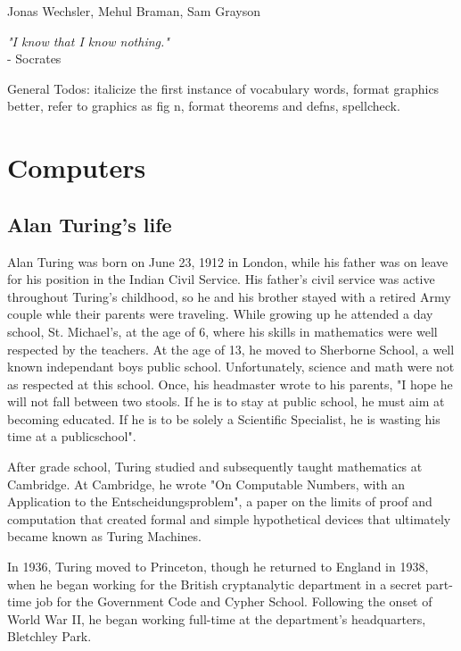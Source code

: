 \documentclass[11pt, letterpaper, twoside, openright]{book}
\begin{document}
\mainmatter

{Jonas Wechsler, Mehul Braman, Sam Grayson}

\begin{flushright}
\textit{"I know that I know nothing."} \\
- Socrates
\end{flushright}

General Todos: italicize the first instance of vocabulary words, format graphics better, refer to graphics as fig n, format theorems and defns, spellcheck.

\section{Computers}  %
\subsection{Alan Turing's life}
Alan Turing was born on June 23, 1912 in London, while his father was on leave for his position in the Indian Civil Service. His father's civil service was active throughout Turing's childhood, so he and his brother stayed with a retired Army couple whle their parents were traveling. While growing up he attended a day school, St. Michael's, at the age of 6, where his skills in mathematics were well respected by the teachers. At the age of 13, he moved to Sherborne School, a well known independant boys public school. Unfortunately, science and math were not as respected at this school. Once, his headmaster wrote to his parents, "I hope he will not fall between two stools. If he is to stay at public school, he must aim at becoming educated. If he is to be solely a Scientific Specialist, he is wasting his time at a publicschool".

After grade school, Turing studied and subsequently taught mathematics at Cambridge. At Cambridge, he wrote "On Computable Numbers, with an Application to the Entscheidungsproblem", a paper on the limits of proof and computation that created formal and simple hypothetical devices that ultimately became known as Turing Machines.

In 1936, Turing moved to Princeton, though he returned to England in 1938, when he began working for the British cryptanalytic department in a secret part-time job for the Government Code and Cypher School. Following the onset of World War II, he began working full-time at the department's headquarters, Bletchley Park.
\end{document}
